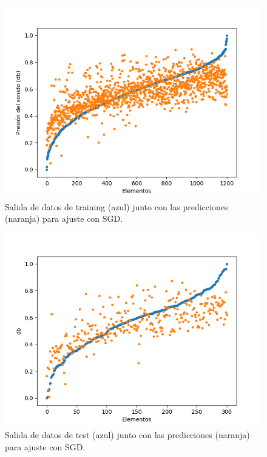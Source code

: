 \documentclass[12pt,spanish]{article} %
\begin{document}
\begin{figure}[H]
  \begin{center}
  \includegraphics[scale=0.8]{s3}
  \caption{Salida de datos de training (azul) junto con las predicciones (naranja) para ajuste con SGD.}
  \label{fig:s3}
  \end{center}
\end{figure}

\begin{figure}[H]
  \begin{center}
  \includegraphics[scale=0.8]{s4}
  \caption{Salida de datos de test (azul) junto con las predicciones (naranja) para ajuste con SGD.}
  \label{fig:s4}
  \end{center}
\end{figure}
\end{document}
